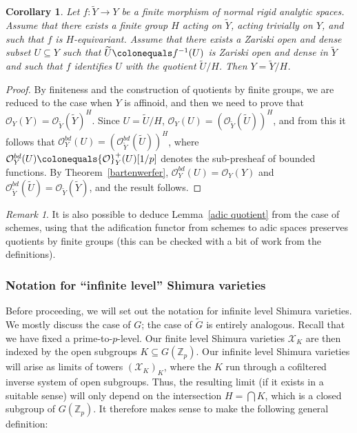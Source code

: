 \documentclass{amsart}
\newtheorem{cor}[subsubsection]{Corollary}
\theoremstyle{remark}
\newtheorem{remark}[subsubsection]{Remark}
\numberwithin{equation}{subsection}
\newcommand{\Z}{\ZZ}
\newcommand{\ZZ}{{\mathbb Z}}
\newcommand{\cO}{{\mathcal O}}
\newcommand{\cX}{{\mathcal X}}
\newcommand{\Zp}{\Z_p}
\newcommand{\tG}{\widetilde{G}}
\newcommand{\sub}{\subseteq}
\newcommand{\defeq}{\colonequals}
\renewcommand{\(}{\left(}
\renewcommand{\)}{\right)}
\begin{document}
\begin{cor}\label{abstract adic quotient} Let $f\colon \widetilde{Y}\to Y$ be a finite 
morphism of normal rigid analytic spaces. Assume that there exists a finite group $H$ acting on $\widetilde{Y}$,
acting trivially on $Y$, and such that $f$ is $H$-equivariant. Assume that there exists a 
Zariski open and dense subset $U\subseteq Y$ such that $\widetilde{U}\defeq f^{-1}(U)$
is Zariski open and dense in $\widetilde{Y}$ and such that $f$ identifies $U$ with
the quotient $\widetilde{U}/H$. Then $Y=\widetilde{Y}/H$.  
\end{cor}

\begin{proof} By finiteness and the construction of quotients by finite groups, 
we are reduced to the case when $Y$ is affinoid, and then we need to prove that
$\cO_Y(Y)=\cO_{\widetilde{Y}}(\widetilde{Y})^{H}$. 
Since $U=\widetilde{U}/H$, $\cO_Y(U)=\left(\cO_{\widetilde{Y}}(\widetilde{U})\right)^{H}$, 
and from this it follows that $\cO^{bd}_Y(U)=\left(\cO^{bd}_{\widetilde{Y}}(\widetilde{U})\right)^{H}$, 
where $\cO^{bd}_Y(U)\defeq \cO^+_Y(U)[1/p]$ denotes the sub-presheaf of bounded functions. 
By Theorem~\ref{bartenwerfer}, $\cO^{bd}_Y(U)=\cO_Y(Y)$ and 
$\cO^{bd}_{\widetilde{Y}}(\widetilde{U})=\cO_{\widetilde{Y}}(\widetilde{Y})$, and the result follows. 
\end{proof}

\begin{remark} It is also possible to deduce Lemma~\ref{adic quotient} from the case of schemes, using that the adification functor from schemes to adic spaces preserves quotients by finite groups (this can be checked with a bit of work from the definitions).
\end{remark} 

\subsubsection{Notation for ``infinite level'' Shimura varieties}\label{notation for infinite level}
Before proceeding, we will set out the notation for infinite level Shimura varieties. We mostly discuss the case of $G$; the case of $\tG$ is entirely analogous. Recall that we have fixed a prime-to-$p$-level. Our finite level Shimura varieties $\cX_K$ are then indexed by the open subgroups $K \sub G(\Zp)$. Our infinite level Shimura varieties will arise as limits of towers $(\cX_K)_K$, where the $K$ run through a cofiltered inverse system of open subgroups. Thus, the resulting limit (if it exists in a suitable sense) will only depend on the intersection $H=\bigcap K$, which is a closed subgroup of $G(\Zp)$. It therefore makes sense to make the following general definition:
\end{document}
